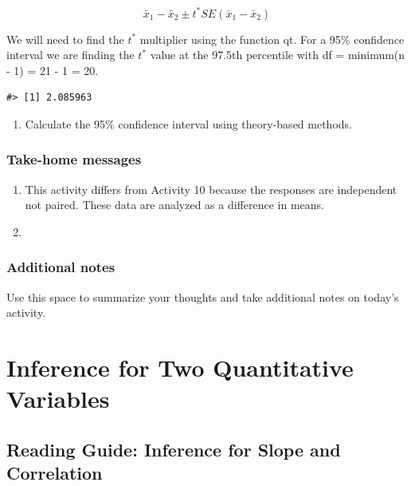 \documentclass[
]{report}
\providecommand{\tightlist}{%
  \setlength{\itemsep}{0pt}\setlength{\parskip}{0pt}}
\begin{document}
\[\bar{x}_1- \bar{x}_2\pm t^* SE(\bar{x}_1- \bar{x}_2)\]

We will need to find the \(t^*\) multiplier using the function qt. For a 95\% confidence interval we are finding the \(t^*\) value at the 97.5th percentile with df = minimum(n - 1) = 21 - 1 = 20.

\begin{verbatim}
#> [1] 2.085963
\end{verbatim}

\begin{enumerate}
\def\labelenumi{\arabic{enumi}.}
\setcounter{enumi}{6}
\tightlist
\item
  Calculate the 95\% confidence interval using theory-based methods.
\end{enumerate}

\vspace{1in}

\hypertarget{take-home-messages-10}{%
\subsection{Take-home messages}\label{take-home-messages-10}}

\begin{enumerate}
\def\labelenumi{\arabic{enumi}.}
\item
  This activity differs from Activity 10 because the responses are independent not paired. These data are analyzed as a difference in means.
\item
\end{enumerate}

\hypertarget{additional-notes-10}{%
\subsection{Additional notes}\label{additional-notes-10}}

Use this space to summarize your thoughts and take additional notes on today's activity.

\hypertarget{inference-for-two-quantitative-variables}{%
\chapter{Inference for Two Quantitative Variables}\label{inference-for-two-quantitative-variables}}

\hypertarget{reading-guide-inference-for-slope-and-correlation}{%
\section{Reading Guide: Inference for Slope and Correlation}\label{reading-guide-inference-for-slope-and-correlation}}
\end{document}
